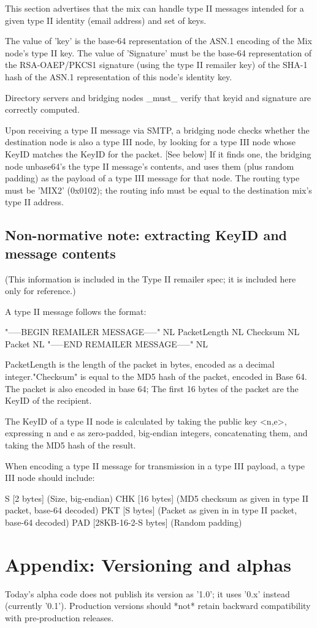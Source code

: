 This section advertises that the mix can handle type II messages
intended for a given type II identity (email address) and set of keys.

The value of 'key' is the base-64 representation of the ASN.1 encoding
of the Mix node's type II key. The value of 'Signature' must be the
base-64 representation of the RSA-OAEP/PKCS1 signature (using the
type II remailer key) of the SHA-1 hash of the ASN.1 representation of
this node's identity key.

Directory servers and bridging nodes _must_ verify that keyid and
signature are correctly computed.

Upon receiving a type II message via SMTP, a bridging node checks
whether the destination node is also a type III node, by looking for a
type III node whose KeyID matches the KeyID for the packet. [See below]
If it finds one, the bridging node unbase64's the type II message's 
contents, and uses them (plus random padding) as the payload
of a type III message for that node.  The routing type must be 'MIX2'
(0x0102); the routing info must be equal to the destination mix's
type II address.

\subsection{Non-normative note: extracting KeyID and message contents}

(This information is included in the Type II remailer spec; it is included
here only for reference.)

A type II message follows the format:

"-----BEGIN REMAILER MESSAGE-----" NL
PacketLength NL
Checksum NL
Packet NL
"-----END REMAILER MESSAGE-----" NL

PacketLength is the length of the packet in bytes, encoded as a
decimal integer."Checksum" is equal to the MD5 hash of the packet,
encoded in Base 64.  The packet is also encoded in base 64; The first
16 bytes of the packet are the KeyID of the recipient.

The KeyID of a type II node is calculated by taking the public key
<n,e>, expressing n and e as zero-padded, big-endian integers,
concatenating them, and taking the MD5 hash of the result.

When encoding a type II message for transmission in a type III payload,
a type III node should include:

S   [2 bytes] (Size, big-endian)
CHK [16 bytes] (MD5 checksum as given in type II packet, base-64 decoded)
PKT [S bytes] (Packet as given in in type II packet, base-64 decoded)
PAD [28KB-16-2-S bytes] (Random padding)

\section{Appendix: Versioning and alphas}

Today's alpha code does not publish its version as '1.0'; it uses
'0.x' instead (currently '0.1').  Production versions should *not*
retain backward compatibility with pre-production releases.

